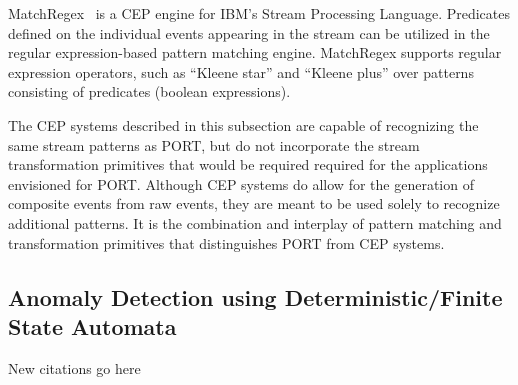 MatchRegex~\cite{DBLP:conf/debs/Hirzel12} is a CEP engine for IBM’s Stream Processing
Language. Predicates defined on the individual events appearing in the
stream can be utilized in the regular expression-based pattern matching
engine. MatchRegex supports regular expression operators, such as “Kleene star”
and “Kleene plus” over patterns consisting of predicates (boolean expressions).

The CEP systems described in this subsection are capable
of recognizing the same stream patterns as PORT,
but do not incorporate the
stream transformation primitives 
that would be required
required for the applications
envisioned for PORT. Although CEP systems do allow for the
generation of composite events from raw events,
they are meant
to be used solely to recognize additional patterns.
It is the combination and interplay of pattern matching and transformation
primitives that distinguishes PORT from CEP systems.


\subsection{Anomaly Detection using Deterministic/Finite State Automata}
New citations go here

